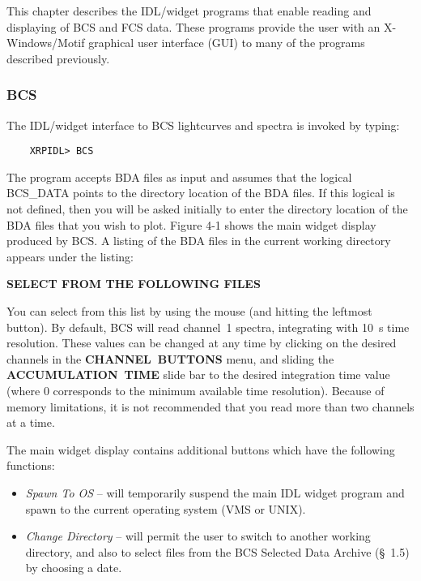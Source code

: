 {{{This chapter describes the IDL/widget programs that 
enable reading and displaying of BCS and FCS data. These programs
provide the user with an \hbox{X-Windows/Motif} graphical user interface (GUI) to
many of the programs described previously.

\subsubsection{BCS}

The IDL/widget interface to BCS lightcurves and spectra is
invoked by typing:
\begin{verbatim}
    XRPIDL> BCS
\end{verbatim}
\noindent The program accepts BDA files as input and assumes that the logical
BCS\_DATA points to the directory  location of the BDA files. If this logical
is not defined, then you will be asked initially to  enter the directory
location of the BDA files that you wish to plot. Figure 4-1 
shows
the main widget display produced by BCS. A listing of the BDA files in the
current  working directory appears under the listing: 
\newline
\newline
\centerline{\bf SELECT FROM THE FOLLOWING FILES}
\newline
\newline
\noindent You can select from this list by using the    
mouse (and hitting the leftmost button). By default, BCS will read channel~1
spectra, integrating  with 10~s time resolution. These values  can be changed
at any time by clicking on the desired channels in the 
\hbox{\bf CHANNEL BUTTONS}
menu, and sliding the \hbox{\bf ACCUMULATION TIME} slide bar to the desired
integration time value (where 0 corresponds to the minimum available time
resolution).  Because of memory limitations, it is not recommended that you
read more than two channels at a time.

The main widget display contains additional buttons which have the following
functions:
\begin{itemize}

\item{\it Spawn To OS} -- will temporarily suspend the main IDL widget
program and spawn to the current operating system (VMS or UNIX).

\item{\it Change Directory} -- will permit the user to switch
to another working directory, and also to select files from the BCS 
Selected Data Archive (\S~1.5) by choosing a date.


\end{itemize}}}}
